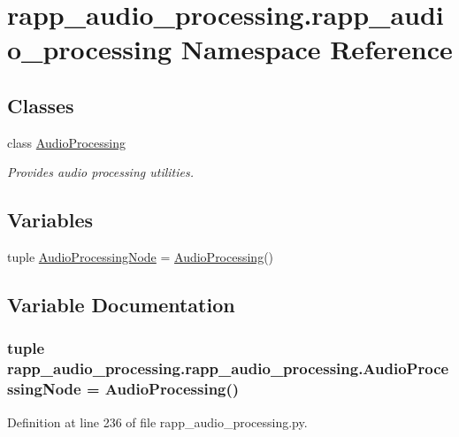\hypertarget{namespacerapp__audio__processing_1_1rapp__audio__processing}{\section{rapp\-\_\-audio\-\_\-processing.\-rapp\-\_\-audio\-\_\-processing Namespace Reference}
\label{namespacerapp__audio__processing_1_1rapp__audio__processing}
}
\subsection*{Classes}
\begin{DoxyCompactItemize}
\item 
class \hyperlink{classrapp__audio__processing_1_1rapp__audio__processing_1_1AudioProcessing}{Audio\-Processing}
\begin{DoxyCompactList}\small\item\em Provides audio processing utilities. \end{DoxyCompactList}\end{DoxyCompactItemize}
\subsection*{Variables}
\begin{DoxyCompactItemize}
\item 
tuple \hyperlink{namespacerapp__audio__processing_1_1rapp__audio__processing_a84653cf2b197c76158dfa50ca85aae35}{Audio\-Processing\-Node} = \hyperlink{classrapp__audio__processing_1_1rapp__audio__processing_1_1AudioProcessing}{Audio\-Processing}()
\end{DoxyCompactItemize}


\subsection{Variable Documentation}
\hypertarget{namespacerapp__audio__processing_1_1rapp__audio__processing_a84653cf2b197c76158dfa50ca85aae35}{
\subsubsection[{Audio\-Processing\-Node}]{\setlength{\rightskip}{0pt plus 5cm}tuple rapp\-\_\-audio\-\_\-processing.\-rapp\-\_\-audio\-\_\-processing.\-Audio\-Processing\-Node = {\bf Audio\-Processing}()}}\label{namespacerapp__audio__processing_1_1rapp__audio__processing_a84653cf2b197c76158dfa50ca85aae35}


Definition at line 236 of file rapp\-\_\-audio\-\_\-processing.\-py.

